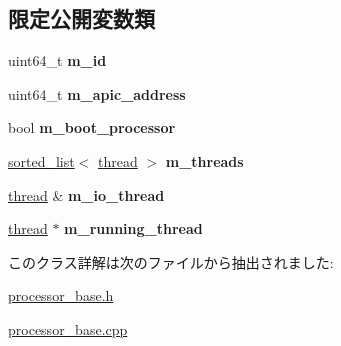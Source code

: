 \subsection*{限定公開変数類}
\begin{DoxyCompactItemize}
\item 
\hypertarget{classprocessor__base_ab445b3c1354265a31d97603fb40e0797}{}uint64\+\_\+t {\bfseries m\+\_\+id}\label{classprocessor__base_ab445b3c1354265a31d97603fb40e0797}

\item 
\hypertarget{classprocessor__base_a96a89dc7297e7c28c0548b786ce52c71}{}uint64\+\_\+t {\bfseries m\+\_\+apic\+\_\+address}\label{classprocessor__base_a96a89dc7297e7c28c0548b786ce52c71}

\item 
\hypertarget{classprocessor__base_a4d4563c5da59f6d620b22978dd7dcf78}{}bool {\bfseries m\+\_\+boot\+\_\+processor}\label{classprocessor__base_a4d4563c5da59f6d620b22978dd7dcf78}

\item 
\hypertarget{classprocessor__base_a43e64f45f8cac6046cf1231e64509eca}{}\hyperlink{classsorted__list}{sorted\+\_\+list}$<$ \hyperlink{classthread}{thread} $>$ {\bfseries m\+\_\+threads}\label{classprocessor__base_a43e64f45f8cac6046cf1231e64509eca}

\item 
\hypertarget{classprocessor__base_a029809d46de2f1f24ca8c4fcdb2b549b}{}\hyperlink{classthread}{thread} \& {\bfseries m\+\_\+io\+\_\+thread}\label{classprocessor__base_a029809d46de2f1f24ca8c4fcdb2b549b}

\item 
\hypertarget{classprocessor__base_af117224c5de5f3ff2db614c88708ae8b}{}\hyperlink{classthread}{thread} $\ast$ {\bfseries m\+\_\+running\+\_\+thread}\label{classprocessor__base_af117224c5de5f3ff2db614c88708ae8b}

\end{DoxyCompactItemize}


このクラス詳解は次のファイルから抽出されました\+:\begin{DoxyCompactItemize}
\item 
\hyperlink{processor__base_8h}{processor\+\_\+base.\+h}\item 
\hyperlink{processor__base_8cpp}{processor\+\_\+base.\+cpp}\end{DoxyCompactItemize}

